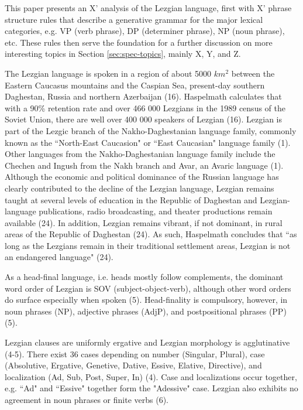 This paper presents an X' analysis of the Lezgian language, first with X' phrase structure rules that describe a generative grammar for the major lexical categories, e.g. VP (verb phrase), DP (determiner phrase), NP (noun phrase), etc. These rules then serve the foundation for a further discussion on more interesting topics in Section \ref{sec:spec-topics}, mainly X, Y, and Z.

The Lezgian language is spoken in a region of about 5000 $km^2$ between the Eastern Caucasus mountains and the Caspian Sea, present-day southern Daghestan, Russia and northern Azerbaijan (16). Haspelmath calculates that with a 90\% retention rate and over 466 000 Lezgians in the 1989 census of the Soviet Union, there are well over 400 000 speakers of Lezgian (16). Lezgian is part of the Lezgic branch of the Nakho-Daghestanian language family, commonly known as the ``North-East Caucasion" or ``East Caucasian" language family (1). Other languages from the Nakho-Daghestanian language family include the Chechen and Ingush from the Nakh branch and Avar, an Avaric language (1). Although the economic and political dominance of the Russian language has clearly contributed to the decline of the Lezgian language, Lezgian remains taught at several levels of education in the Republic of Daghestan and Lezgian-language publications, radio broadcasting, and theater productions remain available (24). In addition, Lezgian remains vibrant, if not dominant, in rural areas of the Republic of Daghestan (24). As such, Haspelmath concludes that ``as long as the Lezgians remain in their traditional settlement areas, Lezgian is not an endangered language" (24).

As a head-final language, i.e. heads mostly follow complements, the dominant word order of Lezgian is SOV (subject-object-verb), although other word orders do surface especially when spoken (5). Head-finality is compulsory, however, in noun phrases (NP), adjective phrases (AdjP), and postpositional phrases (PP) (5).

Lezgian clauses are uniformly ergative and Lezgian morphology is agglutinative (4-5). There exist 36 cases depending on number (Singular, Plural), case (Absolutive, Ergative, Genetive, Dative, Essive, Elative, Directive), and localization (Ad, Sub, Post, Super, In) (4). Case and localizations occur together, e.g. ``Ad" and ``Essive" together form the "Adessive" case. Lezgian also exhibits no agreement in noun phrases or finite verbs (6).